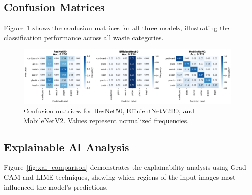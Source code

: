 \documentclass[11pt,a4paper]{article}
\begin{document}
\subsection{Confusion Matrices}

Figure~\ref{fig:confusion_matrices} shows the confusion matrices for all three models, illustrating the classification performance across all waste categories.

\begin{figure}[H]
\centering
\includegraphics[width=\textwidth]{figure2_confusion_matrices.png}
\caption{Confusion matrices for ResNet50, EfficientNetV2B0, and MobileNetV2. Values represent normalized frequencies.}
\label{fig:confusion_matrices}
\end{figure}

\subsection{Explainable AI Analysis}

Figure~\ref{fig:xai_comparison} demonstrates the explainability analysis using Grad-CAM and LIME techniques, showing which regions of the input images most influenced the model's predictions.
\end{document}
